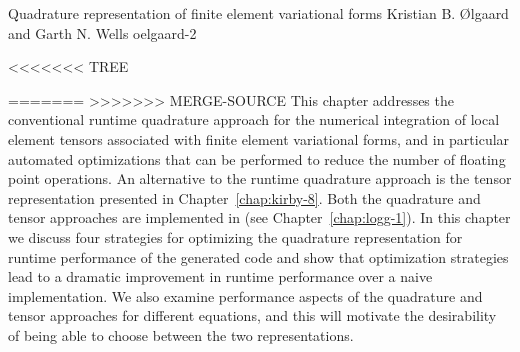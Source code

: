              {Quadrature representation of finite element variational forms}
              {Kristian B. \O{}lgaard and Garth N. Wells}
              {oelgaard-2}

<<<<<<< TREE


=======
>>>>>>> MERGE-SOURCE
This chapter addresses the conventional runtime quadrature approach
for the numerical integration of local element tensors associated
with finite element variational forms, and in particular automated
optimizations that can be performed to reduce the number of floating
point operations.  An alternative to the runtime quadrature approach
is the tensor representation presented in Chapter~\ref{chap:kirby-8}.
Both the quadrature and tensor approaches are implemented in \ffc{}
(see Chapter~\ref{chap:logg-1}).  In this chapter we discuss four
strategies for optimizing the quadrature representation for runtime
performance of the generated code and show that optimization strategies
lead to a dramatic improvement in runtime performance over a naive
implementation.  We also examine performance aspects of the quadrature
and tensor approaches for different equations, and this will motivate
the desirability of being able to choose between the two representations.
